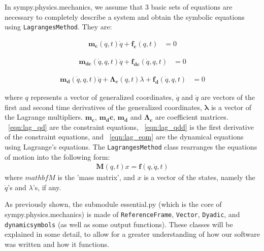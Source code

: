 \documentclass[twocolumn,10pt]{asme2e}
\begin{document}
\begin{description}
    In sympy.physics.mechanics, we assume that 3 basic sets of equations are
    necessary to completely describe a system and obtain the symbolic equations
    using \verb|LagrangesMethod|. They are:

    \label{eqn:lag_qd}
    \begin{align}
        \mathbf{m_{c}}(q, t) \dot{q} + \mathbf{f_{c}}(q, t) &= 0
    \end{align}

    \label{eqn:lag_qdd}
    \begin{align}
        \mathbf{m_{dc}}(\dot{q}, q, t) \ddot{q} + \mathbf{f_{dc}}(\dot{q}, q,
            t) &= 0
    \end{align}

    \label{eqn:lag_eom}
    \begin{align}
        \mathbf{m_d}(\dot{q}, q, t) \ddot{q} + \mathbf{\Lambda_c}(q, t)
            \lambda + \mathbf{f_d}(\dot{q}, q, t) &= 0
    \end{align}

    where $q$ represents a vector of generalized coordinates, $\dot{q}$ and
    $\ddot{q}$ are vectors of the first and second time derivatives of the
    generalized coordinates, $\mathbf{\lambda}$ is a vector of the Lagrange
    multipliers. $\mathbf{m_c}$, $\mathbf{m_dc}$, $\mathbf{m_d}$ and
    $\mathbf{\Lambda_c}$ are coefficient matrices.
    ~\ref{eqn:lag_qd} are the constraint equations, ~\ref{eqn:lag_qdd} is the
    first derivative of the constraint equations, and ~\ref{eqn:lag_eom} are
    the dynamical equations using Lagrange's equations. The
    \verb|LagrangesMethod| class rearranges the equations of motion into the
    following form:
    \label{eqn:lag_rearr}
    \begin{align}
        \mathbf{M}(q, t) x = \mathbf{f}(q, \dot{q}, t)
    \end{align}
    where $mathbf{M}$ is the 'mass matrix', and $x$ is a vector of the states,
    namely the $\ddot{q}$'s and $\lambda$'s, if any.

\end{description}

As previously shown, the submodule essential.py (which is the core of
sympy.physics.mechanics) is made of \verb|ReferenceFrame|, \verb|Vector|,
\verb|Dyadic|, and \verb|dynamicsymbols| (as well as some output functions).
These classes will be explained in some detail, to allow for a greater
understanding of how our software was written and how it functions.
\end{document}
